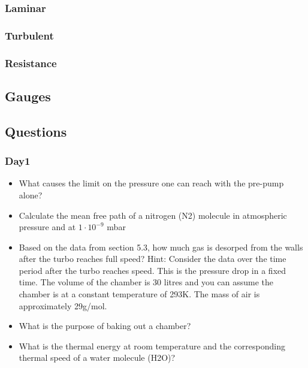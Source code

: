 \documentclass[]{article}
\begin{document}
\subsubsection{Laminar}
\subsubsection{Turbulent}
\subsubsection{Resistance}
\subsection{Gauges}
\subsection{Questions}
\subsubsection{Day1}
\begin{itemize}  
	\item What causes the limit on the pressure one can reach with the pre-pump alone? 
	\item  Calculate the mean free path of a nitrogen (N2) molecule in atmospheric pressure and at $1 \cdot 10^{−9}$ mbar 
	\item Based on the data from section 5.3, how much gas is desorped from the walls after the turbo reaches full speed? Hint: Consider the data over the time period after the turbo reaches speed. This is the pressure drop in a ﬁxed time. The volume of the chamber is 30 litres and you can assume the chamber is at a constant temperature of 293K. The mass of air is approximately 29g/mol.
	 

	\item What is the purpose of baking out a chamber? 
	\item What is the thermal energy at room temperature and the corresponding thermal speed of a water molecule (H2O)?
\end{itemize}
\end{document}

